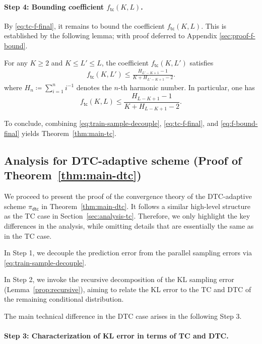 \documentclass[english]{article}
\newcommand{\defn}{\coloneqq}
\newcommand{\tc}{\mathsf{tc}}
\newcommand{\dtc}{\mathsf{dtc}}
\begin{document}
\paragraph{Step 4: Bounding coefficient $f_\tc(K,L)$.}

By \eqref{eq:tc-f-final}, it remains to bound the coefficient $ f_\tc(K, L) $. This is established by the following lemma; with proof deferred to Appendix \ref{sec:proof-f-bound}.
\begin{lemma}\label{lem:f-bound}
For any $K \geq 2$ and $K \leq L' \leq L$, the coefficient $f_\tc(K, L')$ satisfies
\begin{align}
f_\tc(K, L') \leq \frac{H_{L'-K+1} - 1}{K + H_{L'-K+1} - 2}.\label{eq:f-bound}
\end{align}
where $H_n \defn \sum_{i=1}^{n} i^{-1}$ denotes the $n$-th harmonic number.
In particular, one has
\begin{equation}
    \label{eq:f-bound-final}
    f_\tc(K, L) \leq \frac{H_{L-K+1} - 1}{K + H_{L-K+1} - 2}. 
\end{equation}
\end{lemma}

To conclude, combining \eqref{eq:train-sample-decouple}, \eqref{eq:tc-f-final}, and \eqref{eq:f-bound-final} yields Theorem~\ref{thm:main-tc}.

\subsection{Analysis for DTC-adaptive scheme (Proof of Theorem~\ref{thm:main-dtc})}
\label{sec:analysis-dtc}

We proceed to present the proof of the convergence theory of the DTC-adaptive scheme $\pi_{\dtc}$ in Theorem~\ref{thm:main-dtc}. It follows a similar high-level structure as the TC case in Section~\ref{sec:analysis-tc}.
Therefore, we only highlight the key differences in the analysis, while omitting details that are essentially the same as in the TC case.

In Step 1, we decouple the prediction error from the parallel sampling errors via \eqref{eq:train-sample-decouple}.

In Step 2, we invoke the recursive decomposition of the KL sampling error (Lemma~\ref{prop:recursive}), aiming to relate the KL error to the TC and DTC of the remaining conditional distribution.

The main technical difference in the DTC case arises in the following Step 3.

\paragraph{Step 3: Characterization of KL error in terms of TC and DTC.}
\end{document}
